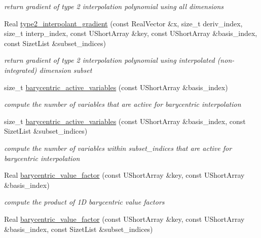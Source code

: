 \begin{DoxyCompactItemize}
\begin{DoxyCompactList}\small\item\em return gradient of type 2 interpolation polynomial using all dimensions \end{DoxyCompactList}\item 
Real \hyperlink{classPecos_1_1SharedInterpPolyApproxData_acfb9530e8107ee37dc01edc67c761ef1}{type2\+\_\+interpolant\+\_\+gradient} (const Real\+Vector \&x, size\+\_\+t deriv\+\_\+index, size\+\_\+t interp\+\_\+index, const U\+Short\+Array \&key, const U\+Short\+Array \&basis\+\_\+index, const Sizet\+List \&subset\+\_\+indices)
\begin{DoxyCompactList}\small\item\em return gradient of type 2 interpolation polynomial using interpolated (non-\/integrated) dimension subset \end{DoxyCompactList}\item 
size\+\_\+t \hyperlink{classPecos_1_1SharedInterpPolyApproxData_a9b52639337c3dfbcd2ddb9588e930abe}{barycentric\+\_\+active\+\_\+variables} (const U\+Short\+Array \&basis\+\_\+index)\label{classPecos_1_1SharedInterpPolyApproxData_a9b52639337c3dfbcd2ddb9588e930abe}

\begin{DoxyCompactList}\small\item\em compute the number of variables that are active for barycentric interpolation \end{DoxyCompactList}\item 
size\+\_\+t \hyperlink{classPecos_1_1SharedInterpPolyApproxData_ab93dce831b1b896b05417fc2b68e4595}{barycentric\+\_\+active\+\_\+variables} (const U\+Short\+Array \&basis\+\_\+index, const Sizet\+List \&subset\+\_\+indices)\label{classPecos_1_1SharedInterpPolyApproxData_ab93dce831b1b896b05417fc2b68e4595}

\begin{DoxyCompactList}\small\item\em compute the number of variables within subset\+\_\+indices that are active for barycentric interpolation \end{DoxyCompactList}\item 
Real \hyperlink{classPecos_1_1SharedInterpPolyApproxData_a93f1de37d982eaf7902e5ed1eb640d3b}{barycentric\+\_\+value\+\_\+factor} (const U\+Short\+Array \&key, const U\+Short\+Array \&basis\+\_\+index)\label{classPecos_1_1SharedInterpPolyApproxData_a93f1de37d982eaf7902e5ed1eb640d3b}

\begin{DoxyCompactList}\small\item\em compute the product of 1D barycentric value factors \end{DoxyCompactList}\item 
Real \hyperlink{classPecos_1_1SharedInterpPolyApproxData_a5b4b1a2390826e5869adc8230512b2e1}{barycentric\+\_\+value\+\_\+factor} (const U\+Short\+Array \&key, const U\+Short\+Array \&basis\+\_\+index, const Sizet\+List \&subset\+\_\+indices)\label{classPecos_1_1SharedInterpPolyApproxData_a5b4b1a2390826e5869adc8230512b2e1}


\end{DoxyCompactItemize}
